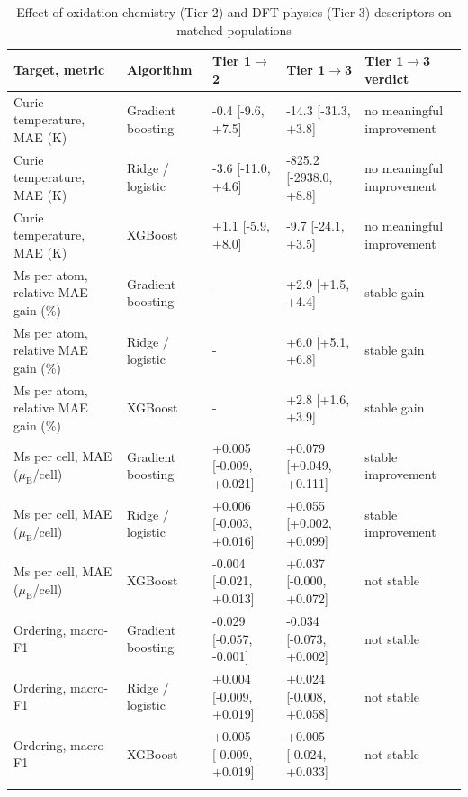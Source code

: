 \begin{table}[h]
\caption{Effect of oxidation-chemistry (Tier 2) and DFT physics (Tier 3) descriptors on matched populations}
\label{tab:table2_physics_descriptors}
\begin{tabular*}{\textwidth}{@{\extracolsep\fill}lllll}
\toprule
Target, metric & Algorithm & Tier 1$\rightarrow$2 & Tier 1$\rightarrow$3 & Tier 1$\rightarrow$3 verdict \\
\midrule
Curie temperature, MAE (K) & Gradient boosting & -0.4 [-9.6, +7.5] & -14.3 [-31.3, +3.8] & no meaningful improvement \\
Curie temperature, MAE (K) & Ridge / logistic & -3.6 [-11.0, +4.6] & -825.2 [-2938.0, +8.8] & no meaningful improvement \\
Curie temperature, MAE (K) & XGBoost & +1.1 [-5.9, +8.0] & -9.7 [-24.1, +3.5] & no meaningful improvement \\
Ms per atom, relative MAE gain (\%) & Gradient boosting & - & +2.9 [+1.5, +4.4] & stable gain \\
Ms per atom, relative MAE gain (\%) & Ridge / logistic & - & +6.0 [+5.1, +6.8] & stable gain \\
Ms per atom, relative MAE gain (\%) & XGBoost & - & +2.8 [+1.6, +3.9] & stable gain \\
Ms per cell, MAE ($\mu_\mathrm{B}$/cell) & Gradient boosting & +0.005 [-0.009, +0.021] & +0.079 [+0.049, +0.111] & stable improvement \\
Ms per cell, MAE ($\mu_\mathrm{B}$/cell) & Ridge / logistic & +0.006 [-0.003, +0.016] & +0.055 [+0.002, +0.099] & stable improvement \\
Ms per cell, MAE ($\mu_\mathrm{B}$/cell) & XGBoost & -0.004 [-0.021, +0.013] & +0.037 [-0.000, +0.072] & not stable \\
Ordering, macro-F1 & Gradient boosting & -0.029 [-0.057, -0.001] & -0.034 [-0.073, +0.002] & not stable \\
Ordering, macro-F1 & Ridge / logistic & +0.004 [-0.009, +0.019] & +0.024 [-0.008, +0.058] & not stable \\
Ordering, macro-F1 & XGBoost & +0.005 [-0.009, +0.019] & +0.005 [-0.024, +0.033] & not stable \\
\botrule
\end{tabular*}
\end{table}
